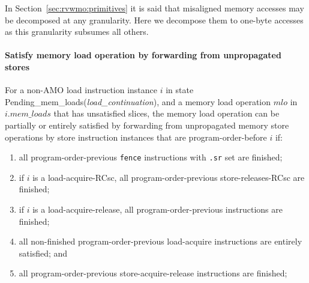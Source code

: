 \begin{commentary}
In Section~\ref{sec:rvwmo:primitives} it is said that misaligned memory accesses may be decomposed at any granularity.
Here we decompose them to one-byte accesses as this granularity subsumes all others.
\end{commentary}

\paragraph{Satisfy memory load operation by forwarding from unpropagated stores}\label{omm:sat_by_forwarding}
For a non-AMO load instruction instance $i$ in state {\sc Pending\_mem\_loads}({\it load\_continuation}), and a memory load operation $mlo$ in $i.\textit{mem\_loads}$ that has unsatisfied slices, the memory load operation can be partially or entirely satisfied by forwarding from unpropagated memory store operations by store instruction instances that are program-order-before $i$ if:
\begin{enumerate}
\item all program-order-previous {\tt fence} instructions with {\tt .sr} set are finished;
\item if $i$ is a load-acquire-RCsc, all program-order-previous store-releases-RCsc are finished;
\item if $i$ is a load-acquire-release, all program-order-previous instructions are finished;
\item all non-finished program-order-previous load-acquire instructions are entirely satisfied; and
\item all program-order-previous store-acquire-release instructions are finished;
\end{enumerate}

